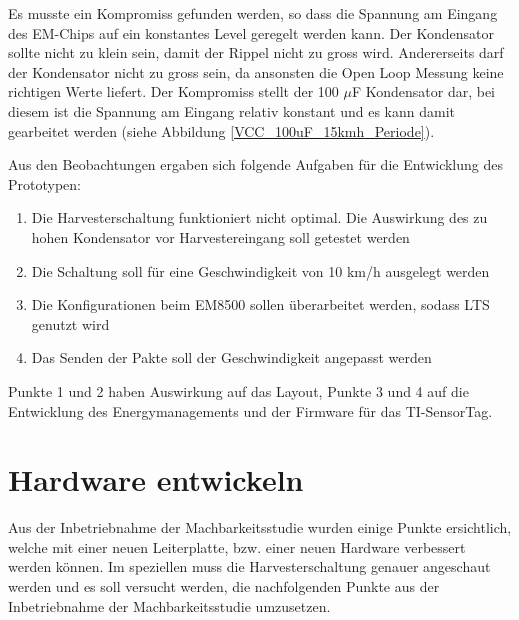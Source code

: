 Es musste ein Kompromiss gefunden werden, so dass die Spannung am Eingang des EM-Chips auf ein konstantes Level geregelt werden kann. Der Kondensator sollte nicht zu klein sein, damit der Rippel nicht zu gross wird. Andererseits darf der Kondensator nicht zu gross sein, da ansonsten die Open Loop Messung keine richtigen Werte liefert. Der Kompromiss stellt der 100 $\mu$F Kondensator dar, bei diesem ist die Spannung am Eingang relativ konstant und es kann damit gearbeitet werden (siehe Abbildung \ref{VCC_100uF_15kmh_Periode}).

Aus den Beobachtungen ergaben sich folgende Aufgaben für die Entwicklung des Prototypen:

\begin{enumerate}
    \item Die Harvesterschaltung funktioniert nicht optimal. Die Auswirkung des zu hohen Kondensator vor Harvestereingang soll getestet werden
    \item Die Schaltung soll für eine Geschwindigkeit von 10 km/h ausgelegt werden
    \item Die Konfigurationen beim EM8500 sollen überarbeitet werden, sodass LTS genutzt wird
    \item Das Senden der Pakte soll der Geschwindigkeit angepasst werden
\end{enumerate}

Punkte 1 und 2 haben Auswirkung auf das Layout, Punkte 3 und 4 auf die Entwicklung des Energymanagements und der Firmware für das TI-SensorTag.








\section{Hardware entwickeln}

Aus der Inbetriebnahme der Machbarkeitsstudie wurden einige Punkte ersichtlich, welche mit einer neuen Leiterplatte, bzw. einer neuen Hardware verbessert werden können. Im speziellen muss die Harvesterschaltung genauer angeschaut werden und es soll versucht werden, die nachfolgenden Punkte aus der Inbetriebnahme der Machbarkeitsstudie umzusetzen. 

